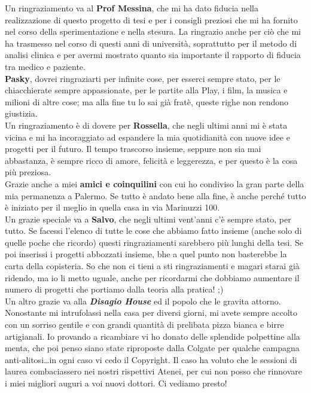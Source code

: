 Un ringraziamento va al \textbf{Prof Messina}, che mi ha dato fiducia nella realizzazione di questo progetto di tesi e per i consigli preziosi che mi ha fornito nel corso della sperimentazione e nella stesura. La ringrazio anche per ciò che mi ha trasmesso nel corso di questi anni di università, soprattutto per il metodo di analisi clinica e per avermi mostrato quanto sia importante il rapporto di fiducia tra medico e paziente. \\

\textbf{Pasky}, dovrei ringraziarti per infinite cose, per esserci sempre stato, per le chiacchierate sempre appassionate, per le partite alla Play, i film, la musica e milioni di altre cose; ma alla fine tu lo sai già fratè, queste righe non rendono giustizia. \\

Un ringraziamento è di dovere per \textbf{Rossella}, che negli ultimi anni mi è stata vicina e mi ha incoraggiato ad espandere la mia quotidianità con nuove idee e progetti per il futuro. Il tempo trascorso insieme, seppure non sia mai abbastanza, è sempre ricco di amore, felicità e leggerezza, e per questo è la cosa più preziosa.\\

Grazie anche a miei \textbf{amici e coinquilini} con cui ho condiviso la gran parte della mia permanenza a Palermo. Se tutto è andato bene alla fine, è anche perché tutto è iniziato per il meglio in quella casa in via Marinuzzi 100.\\

Un grazie speciale va a \textbf{Salvo}, che negli ultimi vent'anni c'è sempre stato, per tutto. Se facessi l'elenco di tutte le cose che abbiamo fatto insieme (anche solo di quelle poche che ricordo) questi ringraziamenti sarebbero più lunghi della tesi. Se poi inserissi i progetti abbozzati insieme, bhe a quel punto non basterebbe la carta della copisteria. So che non ci tieni a sti ringraziamenti e magari starai già ridendo, ma io li metto uguale, anche per ricordarmi che dobbiamo aumentare il numero di progetti che portiamo dalla teoria alla pratica! ;)\\

Un altro grazie va alla \emph{\textbf{Disagio House}} ed il popolo che le gravita attorno. Nonostante mi intrufolassi nella casa per diversi giorni, mi avete sempre accolto con un sorriso gentile e con grandi quantità di prelibata pizza bianca e birre artigianali. Io provando a ricambiare vi ho donato delle splendide polpettine alla menta, che poi penso siano state riproposte dalla Colgate per qualche campagna anti-alitosi\ldots in ogni caso vi cedo il Copyright.
Il caso ha voluto che le sessioni di laurea combaciassero nei nostri rispettivi Atenei, per cui non posso che rinnovare i miei migliori auguri a voi nuovi dottori. Ci vediamo presto!\\



